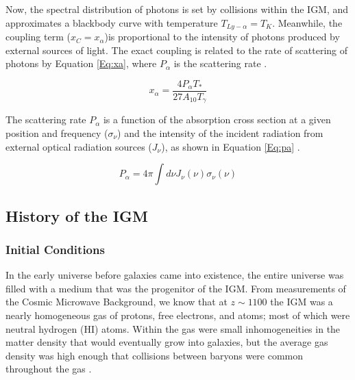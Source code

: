 Now, the spectral distribution of \lya  photons is set by collisions within the IGM, and approximates a blackbody curve with temperature $T_{Ly-\alpha} = T_K$. Meanwhile, the \lya  coupling term ($x_C = x_{\alpha}$)is proportional to the intensity of \lya  photons produced by external sources of light. The exact \lya  coupling is related to the rate of scattering of \lya  photons by Equation \ref{Eq:xa}, where $P_{\alpha}$ is the scattering rate \cite{furlanetto_2006}. 

\begin{equation}\label{Eq:xa}
x_{\alpha} = \frac{4 P_{\alpha} T_*}{27 A_{10} T_{\gamma}}
\end{equation}

The scattering rate $P_{\alpha}$ is a function of the absorption cross section at a given position and frequency ($\sigma_{\nu}$) and the intensity of the incident radiation from external optical radiation sources ($J_{\nu}$), as shown in Equation \ref{Eq:pa} \cite{furlanetto_2006}. 

\begin{equation}\label{Eq:pa}
P_{\alpha} = 4 \pi \int d\nu J_{\nu}(\nu) \sigma_{\nu}(\nu)
\end{equation}


\subsection{History of the IGM} \label{Sec:IGMhist}

\subsubsection{Initial Conditions}
In the early universe before galaxies came into existence, the entire universe was filled with a medium that was the progenitor of the IGM. From measurements of the Cosmic Microwave Background, we know that at $z \sim 1100$ the IGM was a nearly homogeneous gas of protons, free electrons, and atoms; most of which were neutral hydrogen (HI) atoms. Within the gas were small inhomogeneities in the matter density that would eventually grow into galaxies, but the average gas density was high enough that collisions between baryons were common throughout the gas \cite{furlanetto_2006}. 

